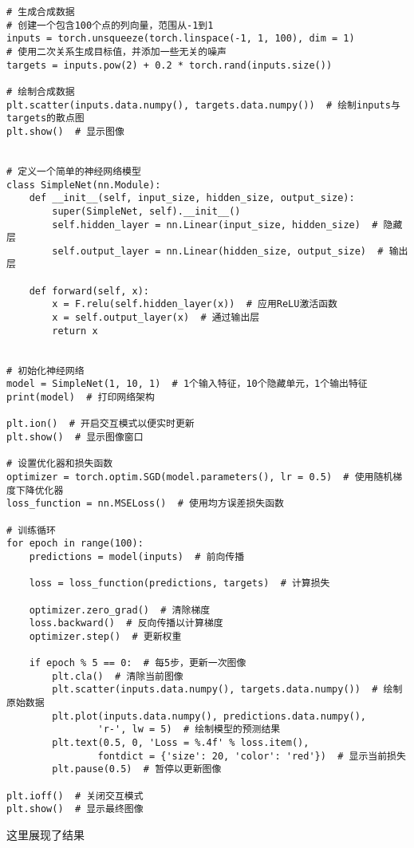 \documentclass[16pt]{lzc}
\begin{document}
        \begin{verbatim}
# 生成合成数据
# 创建一个包含100个点的列向量，范围从-1到1
inputs = torch.unsqueeze(torch.linspace(-1, 1, 100), dim = 1)
# 使用二次关系生成目标值，并添加一些无关的噪声
targets = inputs.pow(2) + 0.2 * torch.rand(inputs.size())

# 绘制合成数据
plt.scatter(inputs.data.numpy(), targets.data.numpy())  # 绘制inputs与targets的散点图
plt.show()  # 显示图像


# 定义一个简单的神经网络模型
class SimpleNet(nn.Module):
    def __init__(self, input_size, hidden_size, output_size):
        super(SimpleNet, self).__init__()
        self.hidden_layer = nn.Linear(input_size, hidden_size)  # 隐藏层
        self.output_layer = nn.Linear(hidden_size, output_size)  # 输出层

    def forward(self, x):
        x = F.relu(self.hidden_layer(x))  # 应用ReLU激活函数
        x = self.output_layer(x)  # 通过输出层
        return x


# 初始化神经网络
model = SimpleNet(1, 10, 1)  # 1个输入特征，10个隐藏单元，1个输出特征
print(model)  # 打印网络架构

plt.ion()  # 开启交互模式以便实时更新
plt.show()  # 显示图像窗口

# 设置优化器和损失函数
optimizer = torch.optim.SGD(model.parameters(), lr = 0.5)  # 使用随机梯度下降优化器
loss_function = nn.MSELoss()  # 使用均方误差损失函数

# 训练循环
for epoch in range(100):
    predictions = model(inputs)  # 前向传播

    loss = loss_function(predictions, targets)  # 计算损失

    optimizer.zero_grad()  # 清除梯度
    loss.backward()  # 反向传播以计算梯度
    optimizer.step()  # 更新权重

    if epoch % 5 == 0:  # 每5步，更新一次图像
        plt.cla()  # 清除当前图像
        plt.scatter(inputs.data.numpy(), targets.data.numpy())  # 绘制原始数据
        plt.plot(inputs.data.numpy(), predictions.data.numpy(),
                'r-', lw = 5)  # 绘制模型的预测结果
        plt.text(0.5, 0, 'Loss = %.4f' % loss.item(),
                fontdict = {'size': 20, 'color': 'red'})  # 显示当前损失
        plt.pause(0.5)  # 暂停以更新图像

plt.ioff()  # 关闭交互模式
plt.show()  # 显示最终图像
        \end{verbatim}

        这里展现了结果
\end{document}
